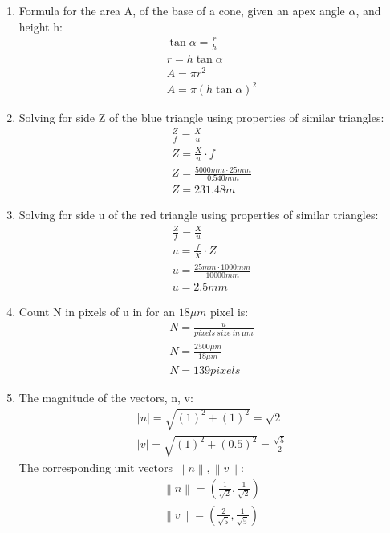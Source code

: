 \documentclass{article}
\begin{document}
\begin{enumerate}
\item
Formula for the area A, of the base of a cone, given an apex angle \( \alpha \), and height h:
\begin{eqnarray*}
\tan \alpha =\frac{r}{h}
\\r=h \tan\alpha
\\A=\pi r^{2}
\\A=\pi\left ( h\tan\alpha \right )^{2}
\end{eqnarray*}

\item
Solving for side Z of the blue triangle using properties of similar triangles:
\begin{eqnarray*}
\frac{Z}{f}=\frac{X}{u}
\\Z=\frac{X}{u}\cdot f
\\Z=\frac{5000 mm \cdot 25 mm}{0.540 mm}
\\Z=231.48m
\end{eqnarray*}

\item
Solving for side u of the red triangle using properties of similar triangles:
\begin{eqnarray*}
\frac{Z}{f}=\frac{X}{u}
\\u=\frac{f}{X}\cdot Z
\\u=\frac{25 mm \cdot 1000 mm}{10000 mm}
\\u=2.5 mm
\end{eqnarray*}

\item
Count N in pixels of u in for an \(18 \mu m\) pixel is:
\begin{eqnarray*}
N=\frac{u}{pixels\:size\:in\:\mu m}
\\N=\frac{2500 \mu m}{18 \mu m}
\\N=139 pixels
\end{eqnarray*}

\item
The magnitude of the vectors, n, v:
\begin{eqnarray*}
\left | n \right |=\sqrt{\left( 1\right )^{2}+\left( 1\right )^{2}}=\sqrt{2}
\\\left | v \right |=\sqrt{\left( 1\right )^{2}+\left( 0.5\right )^{2}}=\frac{\sqrt{5}}{2}
\end{eqnarray*}
\newline
The corresponding unit vectors \(\left \| n \right \|, \left \| v \right \|\):
\begin{eqnarray*}
\left \| n \right \|=(\frac{1}{\sqrt{2}},\frac{1}{\sqrt{2}})
\\\left \| v \right \|=( \frac{2}{\sqrt{5}}, \frac{1}{\sqrt{5}} )
\end{eqnarray*}


\end{enumerate}
\end{document}
